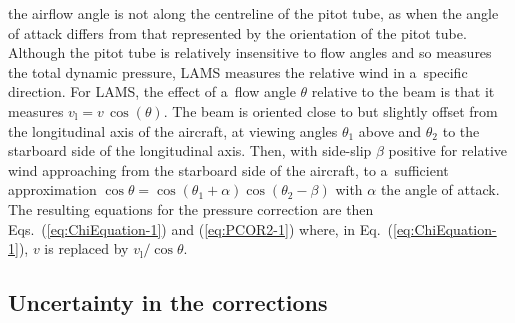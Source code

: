 \documentclass[amtd, online, hvmath]{copernicus}
\begin{document}
\begin{enumerate}
  the airflow angle is not along the centreline of the pitot tube, as
  when the angle of attack differs from that represented by the
  orientation of the pitot tube. Although the pitot tube is relatively
  insensitive to flow angles and so measures the total dynamic
  pressure, LAMS measures the relative wind in a~specific
  direction. For LAMS, the effect of a~flow angle $\theta$ relative to
  the beam is that it measures $v_{\mathrm{l}}=v\,\cos(\theta)$. The beam is
  oriented close to but slightly offset from the longitudinal axis of
  the aircraft, at viewing angles $\theta_1$ above and $\theta_2$ to
  the starboard side of the longitudinal axis. Then, with side-slip
  $\beta$ positive for relative wind approaching from the starboard
  side of the aircraft, to a~sufficient approximation
  $\cos\theta=\cos(\theta_1+\alpha)\cos(\theta_2-\beta)$ with $\alpha$
  the angle of attack. The resulting equations for the pressure
  correction are then Eqs.~(\ref{eq:ChiEquation-1}) and
  (\ref{eq:PCOR2-1}) where, in Eq.~(\ref{eq:ChiEquation-1}), $v$ is
  replaced by $v_{\mathrm{l}}/\cos\theta$.
\end{enumerate}

\subsection{Uncertainty in the corrections}
\end{document}
